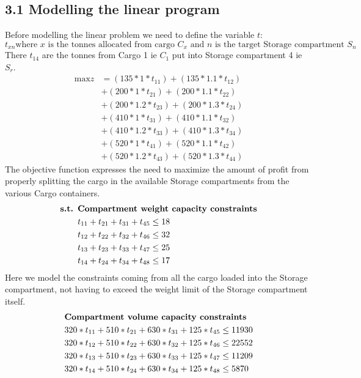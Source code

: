 \documentclass[unicode,11pt,a4paper,oneside,numbers=endperiod,openany]{scrartcl}
\begin{document}
\subsection*{3.1 Modelling the linear program}
Before modelling the linear problem we need to define the variable $t$:\\
$$
t_{xn} \text{where $x$ is the tonnes allocated from cargo $C_x$ and $n$ is the target Storage compartment $S_n$}
$$
There $t_14$ are the tonnes from Cargo 1 ie $C_1$ put into Storage compartment 4 ie $S_r$.
\begin{align*}
  \text{max} z &= (135*1*t_{11}) + (135*1.1*t_{12}) \\
  & +(200*1*t_{21})+(200*1.1*t_{22})\\
  & +(200*1.2*t_{23})+(200*1.3*t_{24})\\
  & +(410*1*t_{31})+(410*1.1*t_{32})\\
  & +(410*1.2*t_{33})+(410*1.3*t_{34})\\
  & +(520*1*t_{41})+(520*1.1*t_{42})\\
  & +(520*1.2*t_{43})+(520*1.3*t_{44})
\end{align*}
The objective function expresses the need to maximize the amount of profit from properly splitting the cargo in the available Storage compartments from the various Cargo containers.
\begin{align*}
  \text{\textbf{s.t. }} & \text{\textbf{Compartment weight capacity constraints}} \\
  & t_{11} + t_{21} + t_{31} + t_{45} \leq 18\\
  & t_{12} + t_{22} + t_{32} + t_{46} \leq 32\\
  & t_{13} + t_{23} + t_{33} + t_{47} \leq 25\\
  & t_{14} + t_{24} + t_{34} + t_{48} \leq 17\\
\end{align*}
Here we model the constraints coming from all the cargo loaded into the Storage compartment, not having to exceed the weight limit of the Storage compartment itself.
\begin{align*}
   & \text{\textbf{Compartment volume capacity constraints}} \\
  & 320*t_{11} + 510*t_{21} + 630*t_{31} + 125*t_{45} \leq 11930\\
  & 320*t_{12} + 510*t_{22} + 630*t_{32} + 125*t_{46} \leq 22552\\
  & 320*t_{13} + 510*t_{23} + 630*t_{33} + 125*t_{47} \leq 11209\\
  & 320*t_{14} + 510*t_{24} + 630*t_{34} + 125*t_{48} \leq 5870\\
\end{align*}
\end{document}
